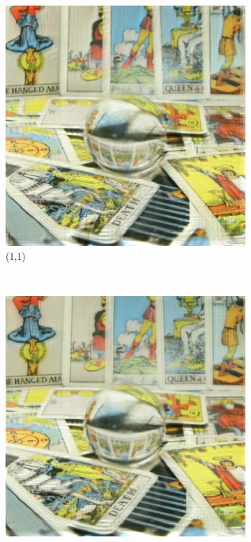 \documentclass[11pt,a4paper,titlepage]{article}
\begin{document}
\begin{figure}
	\centering
	\begin{subfigure}[t]{0.3\textwidth}
		\includegraphics[width=\textwidth]{results/tile_blending/tarot6x6x512x512-512x512x5-sampling=2x_tileRes=200x200_overlap=0.5/Reconstruction_of_view_(1,1).png}
		\caption{(1,1)}
	\end{subfigure}%
	~
	\begin{subfigure}[t]{0.3\textwidth}
		\includegraphics[width=\textwidth]{results/tile_blending/tarot6x6x512x512-512x512x5-sampling=2x_tileRes=200x200_overlap=0.5/Reconstruction_of_view_(1,3).png}

\end{subfigure}
\end{figure}
\end{document}
